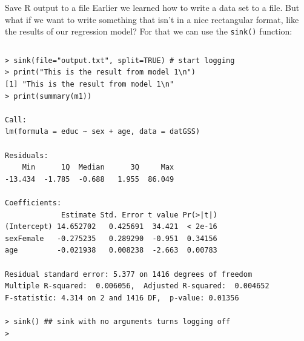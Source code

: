 \documentclass[table,smaller]{beamer}
\begin{document}
\begin{frame}[fragile,label=sec-7-6]{Save R output to a file}
 Earlier we learned how to write a data set to a file. But what if we want to write something that isn't in a nice rectangular format, like the results of our regression model? For that we can use the \verb~sink()~ function:

\vspace{-.5em}
\begin{columns}
\begin{block}{}
\begin{verbatim}
> sink(file="output.txt", split=TRUE) # start logging
> print("This is the result from model 1\n")
[1] "This is the result from model 1\n"
> print(summary(m1))

Call:
lm(formula = educ ~ sex + age, data = datGSS)

Residuals:
    Min      1Q  Median      3Q     Max 
-13.434  -1.785  -0.688   1.955  86.049 

Coefficients:
             Estimate Std. Error t value Pr(>|t|)
(Intercept) 14.652702   0.425691  34.421  < 2e-16
sexFemale   -0.275235   0.289290  -0.951  0.34156
age         -0.021938   0.008238  -2.663  0.00783

Residual standard error: 5.377 on 1416 degrees of freedom
Multiple R-squared:  0.006056,	Adjusted R-squared:  0.004652 
F-statistic: 4.314 on 2 and 1416 DF,  p-value: 0.01356

> sink() ## sink with no arguments turns logging off
>
\end{verbatim}
\end{block}
\end{columns}
\vspace{.5em}
\end{frame}
\end{document}

